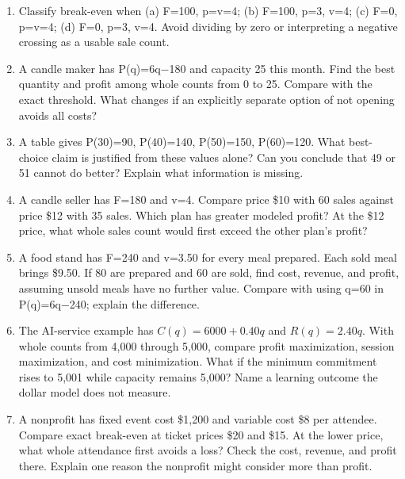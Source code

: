 \documentclass[11pt,letterpaper]{article}
\begin{document}
\begin{enumerate}
\item Classify break-even when (a) F=100, p=v=4; (b) F=100, p=3, v=4; (c) F=0, p=v=4; (d) F=0, p=3, v=4. Avoid dividing by zero or interpreting a negative crossing as a usable sale count.
\item A candle maker has P(q)=6q\ensuremath{-}180 and capacity 25 this month. Find the best quantity and profit among whole counts from 0 to 25. Compare with the exact threshold. What changes if an explicitly separate option of not opening avoids all costs?
\item A table gives P(30)=90, P(40)=140, P(50)=150, P(60)=120. What best-choice claim is justified from these values alone? Can you conclude that 49 or 51 cannot do better? Explain what information is missing.
\item A candle seller has F=180 and v=4. Compare price \$10 with 60 sales against price \$12 with 35 sales. Which plan has greater modeled profit? At the \$12 price, what whole sales count would first exceed the other plan's profit?
\item A food stand has F=240 and v=3.50 for every meal prepared. Each sold meal brings \$9.50. If 80 are prepared and 60 are sold, find cost, revenue, and profit, assuming unsold meals have no further value. Compare with using q=60 in P(q)=6q\ensuremath{-}240; explain the difference.
\item The AI-service example has $C(q)=6000+0.40q$ and $R(q)=2.40q$. With whole counts from 4,000 through 5,000, compare profit maximization, session maximization, and cost minimization. What if the minimum commitment rises to 5,001 while capacity remains 5,000? Name a learning outcome the dollar model does not measure.
\item A nonprofit has fixed event cost \$1,200 and variable cost \$8 per attendee. Compare exact break-even at ticket prices \$20 and \$15. At the lower price, what whole attendance first avoids a loss? Check the cost, revenue, and profit there. Explain one reason the nonprofit might consider more than profit.
\end{enumerate}
\end{document}

